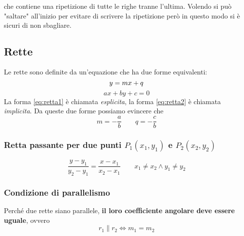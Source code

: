 che contiene una ripetizione di tutte le righe tranne l'ultima. Volendo si può "saltare" all'inizio
per evitare di scrivere la ripetizione però in questo modo si è sicuri di non sbagliare.

\subsection{Rette}\label{subsec:geomanal:retta}
\begin{center}
\end{center}
Le rette sono definite da un'equazione che ha due forme equivalenti:
\begin{equation}\label{eq:retta1}
  y = mx + q\\
\end{equation}
\begin{equation}\label{eq:retta2}
  ax + by + c = 0
\end{equation}
La forma \eqref{eq:retta1} è chiamata \emph{esplicita}, la forma \eqref{eq:retta2} è chiamata 
\emph{implicita}. Da queste due forme possiamo evincere che
\begin{equation*}
  m = -\frac{a}{b} \qquad q = -\frac{c}{b}
\end{equation*}
\setcounter{equation}{0}

\subsubsection{Retta passante per due punti $P_1(x_1,y_1)$ e $P_2(x_2,y_2)$}
\begin{equation*}
  \frac{y-y_1}{y_2-y_1}=\frac{x-x_1}{x_2-x_1} \qquad x_1\neq x_2 \land y_1\neq y_2
\end{equation*}

\subsubsection{Condizione di parallelismo}
Perché due rette siano parallele, \textbf{il loro coefficiente angolare deve essere uguale}, ovvero
\begin{equation*}
  r_1 \| r_2 \iff m_1=m_2
\end{equation*}

